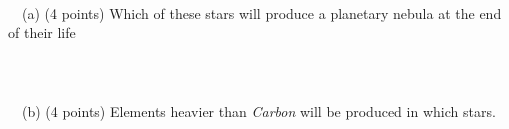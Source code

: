 \documentclass[12pt]{article}
\begin{document}
\\
\\
\\
\indent \ \ (a) (4 points) Which of these stars will produce a planetary nebula at the end of their life        
                       \\
\\
\\
\\
\indent \ \ (b) (4 points)  Elements heavier than \emph{Carbon} will be produced in which stars.        %



\end{document}
